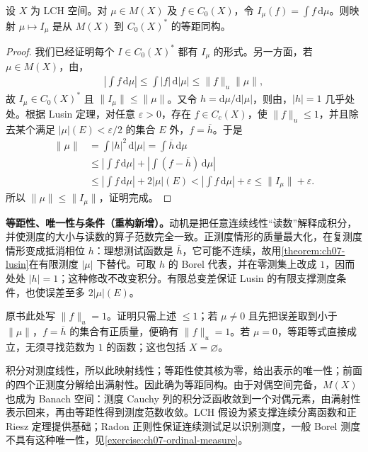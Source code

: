 \documentclass[../../main.tex]{subfiles}
\begin{document}
\begin{theorem}\label{theorem:ch07-riesz-complex}
设 $X$ 为 LCH 空间。对 $\mu\in M(X)$ 及 $f\in C_0(X)$，令 $I_\mu(f)=\int f\,\mathrm d\mu$。则映射 $\mu\mapsto I_\mu$ 是从 $M(X)$ 到 $C_0(X)^*$ 的等距同构。
\end{theorem}
\begin{proof}
我们已经证明每个 $I\in C_0(X)^*$ 都有 $I_\mu$ 的形式。另一方面，若 $\mu\in M(X)$，由，
\begin{align*}
\left|\int f\,\mathrm d\mu\right|\leqslant\int|f|\,\mathrm d|\mu|\leqslant\|f\|_u\|\mu\|,
\end{align*}
故 $I_\mu\in C_0(X)^*$ 且 $\|I_\mu\|\leqslant\|\mu\|$。又令 $h=\mathrm d\mu/\mathrm d|\mu|$，则由，$|h|=1$ 几乎处处。根据 Lusin 定理，对任意 $\varepsilon>0$，存在 $f\in C_c(X)$，使 $\|f\|_u\leqslant1$，并且除去某个满足 $|\mu|(E)<\varepsilon/2$ 的集合 $E$ 外，$f=\overline h$。于是
\begin{align*}
\|\mu\|&=\int|h|^2\,\mathrm d|\mu|=\int\overline h\,\mathrm d\mu\\
&\leqslant\left|\int f\,\mathrm d\mu\right|+\left|\int(f-\overline h)\,\mathrm d\mu\right|\\
&\leqslant\left|\int f\,\mathrm d\mu\right|+2|\mu|(E)
<\left|\int f\,\mathrm d\mu\right|+\varepsilon\leqslant\|I_\mu\|+\varepsilon.
\end{align*}
所以 $\|\mu\|\leqslant\|I_\mu\|$，证明完成。
\end{proof}
\begin{remark}
\textbf{等距性、唯一性与条件（重构新增）。}动机是把任意连续线性“读数”解释成积分，并使测度的大小与读数的算子范数完全一致。正测度情形的质量最大化，在复测度情形变成抵消相位 $h$：理想测试函数是 $\overline h$，它可能不连续，故用\cref{theorem:ch07-lusin}在有限测度 $|\mu|$ 下替代。可取 $h$ 的 Borel 代表，并在零测集上改成 $1$，因而处处 $|h|=1$；这种修改不改变积分。有限总变差保证 Lusin 的有限支撑测度条件，也使误差至多 $2|\mu|(E)$。

原书此处写 $\|f\|_u=1$。证明只需上述 $\leqslant1$；若 $\mu\ne0$ 且先把误差取到小于 $\|\mu\|$，$f=\overline h$ 的集合有正质量，便确有 $\|f\|_u=1$。若 $\mu=0$，等距等式直接成立，无须寻找范数为 $1$ 的函数；这也包括 $X=\varnothing$。

积分对测度线性，所以此映射线性；等距性使其核为零，给出表示的唯一性；前面的四个正测度分解给出满射性。因此确为等距同构。由于对偶空间完备，$M(X)$ 也成为 Banach 空间：测度 Cauchy 列的积分泛函收敛到一个对偶元素，由满射性表示回来，再由等距性得到测度范数收敛。LCH 假设为紧支撑连续分离函数和正 Riesz 定理提供基础；Radon 正则性保证连续测试足以识别测度，一般 Borel 测度不具有这种唯一性，见\cref{exercise:ch07-ordinal-measure}。
\end{remark}
\end{document}
